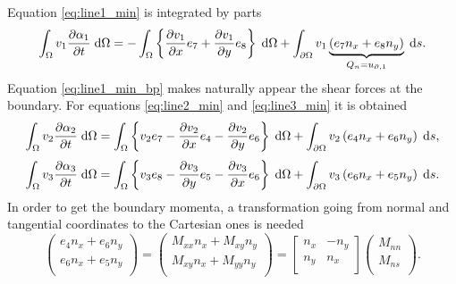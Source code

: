 \documentclass[preprint,12pt]{elsarticle}
\begin{document}
Equation \eqref{eq:line1_min} is integrated by parts
\begin{equation}
\label{eq:line1_min_bp}
\int_{\Omega} v_1 \diffp{\alpha_1}{t} \d\Omega = -\int_{\Omega} \left\{ \diffp{v_1}{x} e_7 + \diffp{v_1}{y} e_8 \right\} \d\Omega + \int_{\partial \Omega} v_1 \underbrace{\left( e_7 n_x + e_8 n_y \right)}_{Q_n = u_{\partial, 1} } \d{s}.
\end{equation}
Equation \eqref{eq:line1_min_bp} makes naturally appear the shear forces at the boundary. For equations \eqref{eq:line2_min} and \eqref{eq:line3_min} it is obtained
\begin{equation}
\int_{\Omega} v_2 \diffp{\alpha_2}{t} \d\Omega = \int_{\Omega} \left\{ v_2 e_7 - \diffp{v_2}{x} e_4 - \diffp{v_2}{y} e_6 \right\} \d\Omega + \int_{\partial \Omega} v_2 \left( e_4 n_x + e_6 n_y \right) \d{s},
\end{equation}
\begin{equation}
\int_{\Omega} v_3 \diffp{\alpha_3}{t} \d\Omega = \int_{\Omega} \left\{ v_3 e_8 - \diffp{v_3}{y} e_5 - \diffp{v_3}{x} e_6 \right\} \d\Omega + \int_{\partial \Omega} v_3 \left( e_6 n_x + e_5 n_y \right) \d{s}.
\end{equation}
In order to get the boundary momenta, a transformation going from normal and tangential coordinates to the Cartesian ones is needed
\begin{equation}
\begin{pmatrix}
e_4 n_x + e_6 n_y \\
e_6 n_x + e_5 n_y \\
\end{pmatrix} =
\begin{pmatrix}
M_{xx} n_x + M_{xy} n_y \\
M_{xy} n_x + M_{yy} n_y \\
\end{pmatrix} =
\begin{bmatrix}
n_x & -n_y \\
n_y &  n_x \\
\end{bmatrix}
\begin{pmatrix}
M_{nn} \\
M_{ns} \\
\end{pmatrix}.
\end{equation}
\end{document}
